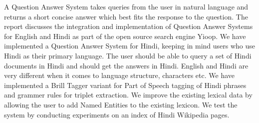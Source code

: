 A Question Answer System takes queries from the user in natural language and returns a short concise answer which best fits the response to the question. The report discusses the integration and implementation of Question Answer Systems for English and Hindi as part of the  open source search engine Yioop. We have implemented a Question Answer System for Hindi, keeping in mind users who use Hindi as their primary language. The user should be able to query a set of Hindi documents in Hindi and should get the answers in Hindi. English and Hindi are very different when it comes to language structure, characters etc. We have implemented a Brill Tagger variant for Part of Speech tagging of Hindi phrases and grammer rules for triplet extraction. We improve the existing lexical data by allowing the user to add Named Entities to the existing lexicon. We test the system by conducting experiments on an index of Hindi Wikipedia pages.
